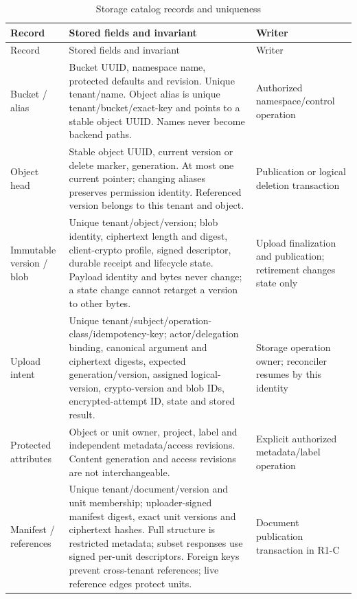 \begin{longtable}{@{}P{0.19\textwidth}P{0.43\textwidth}P{0.26\textwidth}@{}}
\caption{Storage catalog records and uniqueness}\label{tab:storagecatalog}\\
\toprule Record & Stored fields and invariant & Writer\\\midrule\endfirsthead
\toprule Record & Stored fields and invariant & Writer\\\midrule\endhead
Bucket / alias & Bucket UUID, namespace name, protected defaults and revision. Unique tenant/name. Object alias is unique tenant/bucket/exact-key and points to a stable object UUID. Names never become backend paths. & Authorized namespace/control operation\\
Object head & Stable object UUID, current version or delete marker, generation. At most one current pointer; changing aliases preserves permission identity. Referenced version belongs to this tenant and object. & Publication or logical deletion transaction\\
Immutable version / blob & Unique tenant/object/version; blob identity, ciphertext length and digest, client-crypto profile, signed descriptor, durable receipt and lifecycle state. Payload identity and bytes never change; a state change cannot retarget a version to other bytes. & Upload finalization and publication; retirement changes state only\\
Upload intent & Unique tenant/subject/operation-class/idempotency-key; actor/delegation binding, canonical argument and ciphertext digests, expected generation/version, assigned logical-version, crypto-version and blob IDs, encrypted-attempt ID, state and stored result. & Storage operation owner; reconciler resumes by this identity\\
Protected attributes & Object or unit owner, project, label and independent metadata/access revisions. Content generation and access revisions are not interchangeable. & Explicit authorized metadata/label operation\\
Manifest / references & Unique tenant/document/version and unit membership; uploader-signed manifest digest, exact unit versions and ciphertext hashes. Full structure is restricted metadata; subset responses use signed per-unit descriptors. Foreign keys prevent cross-tenant references; live reference edges protect units. & Document publication transaction in R1-C\\
\bottomrule
\end{longtable}

